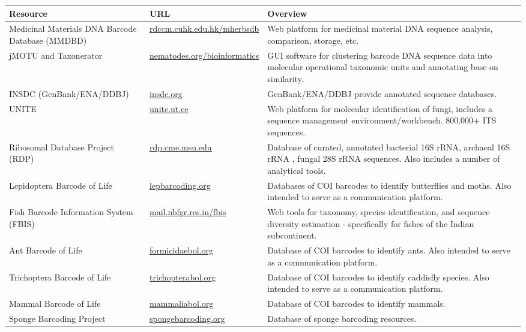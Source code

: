 \documentclass[letterpaper,10pt,hidelinks]{article}
\begin{document}
\begin{table}[h]
	\centering
	\begin{tabular}{p{4cm} p{4cm} p{7cm}}
		\toprule
		{\textbf{Resource}} & {\textbf{URL}} & {\textbf{Overview}} \\
		\midrule
		{Medicinal Materials DNA Barcode Database (MMDBD)} & {\url{rdccm.cuhk.edu.hk/mherbsdb}} & {Web platform 
		for medicinal material DNA sequence analysis, comparison, storage, etc.} \\ \midrule
		{jMOTU and Taxonerator} & {\url{nematodes.org/bioinformatics}} & {GUI software for clustering barcode DNA 
		sequence data into molecular operational taxonomic units and annotating base on similarity.} \\
		\midrule
		{INSDC (GenBank/ENA/DDBJ)} & {\url{insdc.org}} & {GenBank/ENA/DDBJ provide annotated sequence databases.} \\
		\midrule
		{UNITE} & {\url{unite.ut.ee}} & {Web platform for molecular identification of fungi, includes a sequence 
		management environment/workbench. 800,000+ ITS sequences.} \\
		\midrule
		{Ribosomal Database Project (RDP)} & {\url{rdp.cme.msu.edu}} & {Database of curated, annotated bacterial 
		16S rRNA, archaeal 16S rRNA , fungal 28S rRNA sequences. Also includes a number of analytical tools.} \\
		\midrule
		{Lepidoptera Barcode of Life} & {\url{lepbarcoding.org}} & {Databases of COI barcodes to identify butterflies 
		and moths. Also intended to serve as a communication platform.} \\
		\midrule
		{Fish Barcode Information System (FBIS)} & {\url{mail.nbfgr.res.in/fbis}} & {Web tools for taxonomy, species 
		identification, and sequence diversity estimation - specifically for fishes of the Indian subcontinent.} \\ 
		\midrule
		{Ant Barcode of Life} & {\url{formicidaebol.org}} & {Database of COI barcodes to identify ants. Also intended 
		to serve as a communication platform.} \\
		\midrule
		{Trichoptera Barcode of Life} & {\url{trichopterabol.org}} & {Database of COI barcodes to identify caddisfly 
		species. Also intended to serve as a communication platform.}
		\\ 
		\midrule
		{Mammal Barcode of Life} & {\url{mammaliabol.org}} & {Database of COI barcodes to identify mammals.} \\
		\midrule
		{Sponge Barcoding Project} & {\url{spongebarcoding.org}} & {Database of sponge barcoding resources.} \\
		\bottomrule
	\end{tabular}
\end{table}

		
\end{document}
